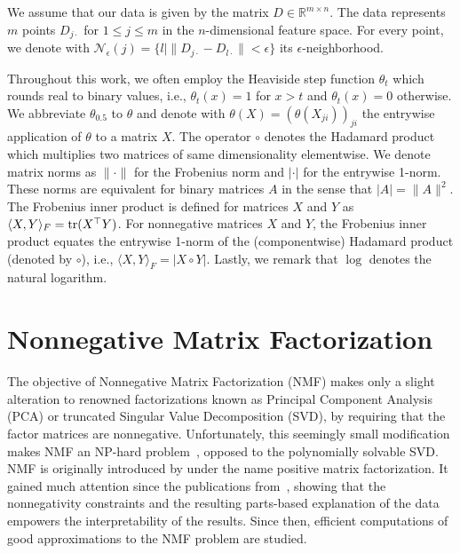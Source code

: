 We assume that our data is given by the matrix $D\in\mathbb{R}^{m\times n}$. The data represents $m$ points $D_{j\cdot}$ for $1\leq j\leq m$ in the $n$-dimensional feature space. For every point, we denote with $\mathcal{N}_\epsilon(j)=\{l| \|D_{j\cdot}-D_{l\cdot}\|<\epsilon\}$ its $\epsilon$-neighborhood.

Throughout this work, we often employ the Heaviside step function $\theta_t$ which rounds real to binary values, i.e., $\theta_t(x)=1$ for $x> t$  and $\theta_t(x)=0$ otherwise. We abbreviate $\theta_{0.5}$ to $\theta$ and denote with $\theta(X)=(\theta(X_{ji}))_{ji}$ the entrywise application of $\theta$ to a matrix $X$.
The operator $\circ$ denotes the Hadamard product which multiplies two matrices of same dimensionality elementwise. 
We denote matrix norms as $\|\cdot\|$ for the Frobenius norm and $|\cdot|$ for the entrywise 1-norm. These norms are equivalent for binary matrices $A$ in the sense that $|A|=\|A\|^2$. The Frobenius inner product is defined for matrices $X$ and $Y$ as $\langle X,Y\rangle_F=\operatorname*{tr}(X^\top Y)$. For nonnegative matrices $X$ and $Y$, the Frobenius inner product equates the entrywise 1-norm of the (componentwise) Hadamard product (denoted by $\circ$), i.e., $\langle X,Y\rangle_F=|X\circ Y|$. 
Lastly, we remark that $\log$ denotes the natural logarithm. 
\section{Nonnegative Matrix Factorization}
The objective of Nonnegative Matrix Factorization (NMF) makes only a slight alteration to renowned factorizations known as Principal Component Analysis (PCA) or truncated Singular Value Decomposition (SVD), by requiring that the factor matrices are nonnegative. Unfortunately, this seemingly small modification makes NMF an NP-hard problem~\citep{vavasis2009complexity}, opposed to the polynomially solvable SVD. NMF is originally introduced by \cite{paatero1994positive} under the name positive matrix factorization. It gained much attention since the publications from~\citeauthor{lee1999learning}, showing that the nonnegativity constraints and the resulting parts-based explanation of the data empowers the interpretability of the results. Since then, efficient computations of good approximations to the NMF problem are studied.            


